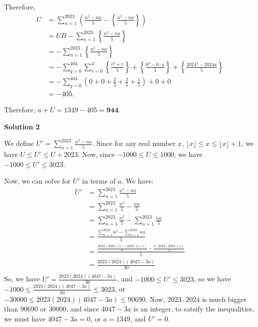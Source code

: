 \begin{enumerate}
{{ Therefore,
 \begin{align*} U & =  \sum_{n=1}^{2023} \left(  \frac{n^2 - na}{5} - \left\{ \frac{n^2 - na}{5} \right\}  \right) \\ & = UB - \sum_{n=1}^{2023} \left\{ \frac{n^2 - na}{5} \right\} \\ & = - \sum_{n=1}^{2023} \left\{ \frac{n^2 - na}{5} \right\} \\ & = - \sum_{q=0}^{404} \sum_{r=0}^4 \left\{\frac{r^2 + r}{5}  \right\} + \left\{ \frac{0^2 - 0 \cdot a}{5} \right\} + \left\{ \frac{2024^2 - 2024a}{5} \right\} \\ & = - \sum_{q=0}^{404} \left( 0 + 0 + \frac{2}{5} + \frac{2}{5} + \frac{1}{5} \right) + 0 + 0 \\ & = - 405 . \end{align*}


 Therefore, $a + U = 1349 - 405 = \boxed{\textbf{944}}$.

 



\textbf{Solution 2}

We define $U' = \sum^{2023}_{n=1} {\frac{n^2-na}{5}}$. Since for any real number $x$, $\lfloor x \rfloor \le x \le \lfloor x \rfloor + 1$, we have $U \le U' \le U + 2023$. Now, since $-1000 \le U \le 1000$, we have $-1000 \le U' \le 3023$.

 Now, we can solve for $U'$ in terms of $a$. We have:
 \begin{align*} U' &= \sum^{2023}_{n=1} {\frac{n^2-na}{5}} \\ &= \sum^{2023}_{n=1} {\frac{n^2}{5} - \frac{na}{5}} \\ &= \sum^{2023}_{n=1} {\frac{n^2}{5}} - \sum^{2023}_{n=1} {\frac{na}{5}} \\ &= \frac{\sum^{2023}_{n=1} {{n^2}} - \sum^{2023}_{n=1} {na}}{5} \\ &= \frac{\frac{2023(2023+1)(2023 \cdot 2 + 1)}{6} - \frac{a \cdot 2023(2023+1)}{2} }{5} \\ &= \frac{2023(2024)(4047-3a)}{30} \\ \end{align*}
So, we have $U' = \frac{2023(2024)(4047-3a)}{30}$, and $-1000 \le U' \le 3023$, so we have $-1000 \le \frac{2023(2024)(4047-3a)}{30} \le 3023$, or $-30000 \le 2023(2024)(4047-3a) \le 90690$. Now, $2023 \cdot 2024$ is much bigger than $90690$ or $30000$, and since $4047-3a$ is an integer, to satsify the inequalities, we must have $4047 - 3a = 0$, or $a = 1349$, and $U' = 0$.

}}
\end{enumerate}
